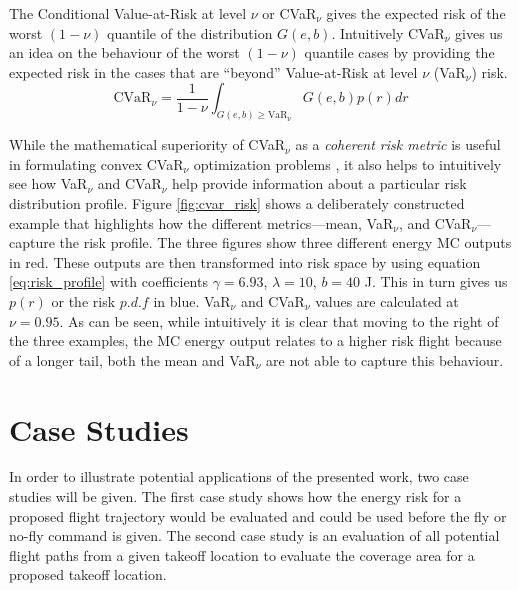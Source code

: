 \documentclass[letterpaper, 10 pt, conference]{ieeeconf}
\begin{document}
The Conditional Value-at-Risk at level $\nu$ or CVaR$_{\nu}$ gives the expected risk of the worst $(1-\nu)$ quantile of the distribution $G(e,b)$. Intuitively CVaR$_{\nu}$ gives us an idea on the behaviour of the worst $(1-\nu)$ quantile cases by providing the expected risk in the cases that are ``beyond'' Value-at-Risk at level $\nu$ (VaR$_{\nu}$) risk.
\begin{equation}
    \text{CVaR}_{\nu} = \frac{1}{1-\nu}\int_{G(e,b) \geq \text{VaR}_{\nu}} G(e,b)p(r)dr
    \label{eq:cvar}
\end{equation}




While the mathematical superiority of CVaR$_{\nu}$ as a \textit{coherent risk metric} \cite{majumdar2020should} is useful in formulating convex CVaR$_{\nu}$ optimization problems \cite{rockafellar2000optimization}, it also helps to intuitively see how VaR$_{\nu}$ and CVaR$_{\nu}$ help provide information about a particular risk distribution profile. Figure \ref{fig:cvar_risk} shows a deliberately constructed example that highlights how the different metrics---mean, VaR$_{\nu}$, and CVaR$_{\nu}$---capture the risk profile. The three figures show three different energy MC outputs in red. These outputs are then transformed into risk space by using equation \ref{eq:risk_profile} with coefficients $\gamma = 6.93$, $\lambda = 10$, $b = 40$ J. This in turn gives us $p(r)$ or the risk $p.d.f$ in blue. VaR$_{\nu}$ and CVaR$_{\nu}$ values are calculated at $\nu = 0.95$. As can be seen, while intuitively it is clear that moving to the right of the three examples, the MC energy output relates to a higher risk flight because of a longer tail, both the mean and VaR$_{\nu}$ are not able to capture this behaviour. 


\section{Case Studies}
\label{sec:case_studies}

In order to illustrate potential applications of the presented work, two case studies will be given. The first case study shows how the energy risk for a proposed flight trajectory would be evaluated and could be used before the fly or no-fly command is given. The second case study is an evaluation of all potential flight paths from a given takeoff location to evaluate the coverage area for a proposed takeoff location. 
\end{document}
